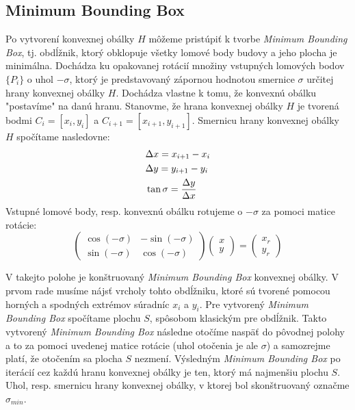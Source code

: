 \documentclass[11pt]{article}
\begin{document}
\subsection{Minimum Bounding Box}\label{mbb}
Po vytvorení konvexnej obálky $H$ môžeme pristúpiť k tvorbe \textit{Minimum Bounding Box}, tj. obdĺžnik, ktorý obklopuje všetky lomové body budovy a jeho plocha je minimálna. Dochádza ku opakovanej rotácií množiny vstupných lomových bodov $\{P_i\}$ o uhol $-\sigma$, ktorý je predstavovaný zápornou hodnotou smernice $\sigma$ určitej hrany konvexnej obálky $H$. Dochádza vlastne k tomu, že konvexnú obálku "postavíme" na danú hranu. \newline Stanovme, že hrana konvexnej obálky $H$ je tvorená bodmi $C_i = [x_i, y_i]$ a $C_{i+1} = [x_{i+1}, y_{i+1}]$. Smernicu hrany konvexnej obálky $H$ spočítame nasledovne:
\begin{align}
    \nonumber&\Delta x = x_{i+1} - x_i\\
    \nonumber&\Delta y = y_{i+1} - y_i\\\bigskip
    \nonumber&\tan \sigma = \frac{\Delta y}{\Delta x}
\end{align}
Vstupné lomové body, resp. konvexnú obálku rotujeme o $-\sigma$ za pomoci matice rotácie:\newline
\begin{equation*}
    \begin{pmatrix}
        \cos (-\sigma) & - \sin (-\sigma)\\
        \sin (-\sigma) & \cos (-\sigma)
    \end{pmatrix}
    \begin{pmatrix}
        x\\
        y
    \end{pmatrix}
    =
    \begin{pmatrix}
        x_r\\
        y_r
    \end{pmatrix}
\end{equation*}

\indent V takejto polohe je konštruovaný \textit{Minimum Bounding Box} konvexnej obálky.
V prvom rade musíme nájsť vrcholy tohto obdĺžniku, ktoré sú tvorené pomocou horných a spodných extrémov súradníc $x_i$ a $y_i$. Pre vytvorený \textit{Minimum Bounding Box} spočítame plochu $S$, spôsobom klasickým pre obdĺžnik. Takto vytvorený \textit{Minimum Bounding Box} následne otočíme naspäť do pôvodnej polohy a to za pomoci uvedenej matice rotácie (uhol otočenia je ale $\sigma$) a samozrejme platí, že otočením sa plocha $S$ nezmení.
\noindent Výsledným \textit{Minimum Bounding Box} po iterácií cez každú hranu konvexnej obálky je ten, ktorý má najmenšiu plochu $S$. Uhol, resp. smernicu hrany konvexnej obálky, v ktorej bol skonštruovaný označme $\sigma_{min}$.
\end{document}
